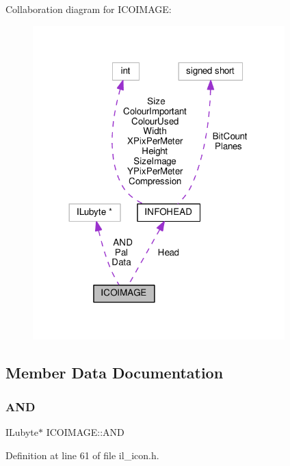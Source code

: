 Collaboration diagram for I\+C\+O\+I\+M\+A\+GE\+:
\nopagebreak
\begin{figure}[H]
\begin{center}
\leavevmode
\includegraphics[width=276pt]{d2/d4e/structICOIMAGE__coll__graph}
\end{center}
\end{figure}


\subsection{Member Data Documentation}
\mbox{\label{structICOIMAGE_a707a2c74ec19c10a5c13b880410d4722}} 
\subsubsection{\texorpdfstring{A\+ND}{AND}}
{\footnotesize\ttfamily I\+Lubyte$\ast$ I\+C\+O\+I\+M\+A\+G\+E\+::\+A\+ND}



Definition at line 61 of file il\+\_\+icon.\+h.

\mbox{\label{structICOIMAGE_acde0f8d93798a34454eb9ba22b5aa6bb}} 
